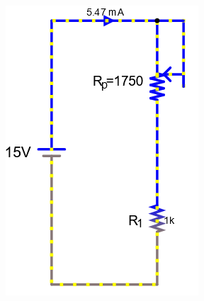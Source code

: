 \documentclass[a4paper]{article}
\begin{document}
\begin{figure}[H]
\begin{subfigure}{0.333\textwidth}
        \includegraphics[width=.9\linewidth]{pot7}
    \end{subfigure}
    \begin{subfigure}{0.333\textwidth}

\end{subfigure}
\end{figure}
\end{document}

